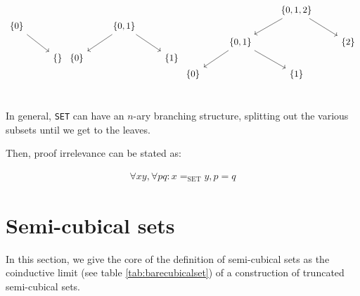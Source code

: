\documentclass[10pt]{amsart}
\theoremstyle{definition}
\numberwithin{definition}{subsection}
\numberwithin{definition}{section}
\begin{document}
\begin{equation*}
  \begin{tikzcd}
    \{0\} \arrow[dr] & \\
    & \{\} \\
  \end{tikzcd}
  \begin{tikzcd}
    & \{0, 1\} \arrow[dr]\arrow[dl] & \\
    \{0\} & & \{1\} \\
  \end{tikzcd}
  \begin{tikzcd}
    & & \{0, 1, 2\} \arrow[dr]\arrow[dl] & \\
    & \{0, 1\} \arrow[dl]\arrow[dr] & & \{2\} \\
    \{0\} & & \{1\} & \\
  \end{tikzcd}
\end{equation*}

In general, \texttt{SET} can have an $n$-ary branching structure, splitting out the various subsets until we get to the leaves.

Then, proof irrelevance can be stated as:

\begin{align*}
  \forall x y, \forall p q : x =_{\textrm{SET}} y, p = q
\end{align*}

\section{Semi-cubical sets}
In this section, we give the core of the definition of semi-cubical
sets as the coinductive limit (see table \ref{tab:barecubicalset}) of a
construction of truncated semi-cubical sets.
\end{document}
